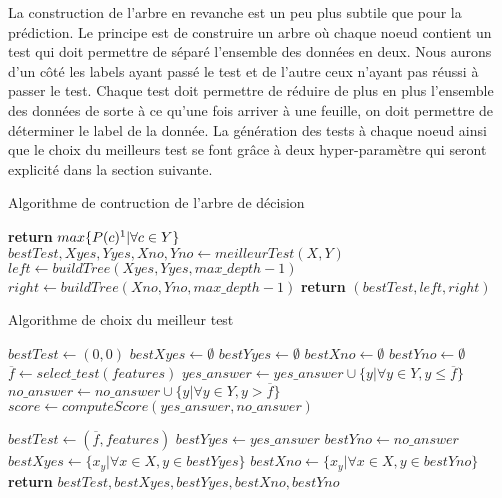 \documentclass[french, 14pt]{memoir}
\begin{document}
La construction de l'arbre en revanche est un peu plus subtile que pour la prédiction. Le principe est de construire un arbre où chaque noeud contient un test qui doit permettre de séparé l'ensemble des données en deux. Nous aurons d'un côté les labels ayant passé le test et de l'autre ceux n'ayant pas réussi à passer le test. Chaque test doit permettre de réduire de plus en plus l'ensemble des données de sorte à ce qu'une fois arriver à une feuille, on doit permettre de déterminer le label de la donnée. La génération des tests à chaque noeud ainsi que le choix du meilleurs test se font grâce à deux hyper-paramètre qui seront explicité dans la section suivante. 

\begin{algorithm}
\begin{minipage}[t]{20cm}
\caption{Algorithme de contruction de l'arbre de décision}
\label{buildTree}
\begin{algorithmic}[1]
\State \textbf{return} $max\{P(c)\footnote{où P(c) est la probabilité d'apparition de la classe c dans Y}|\forall c \in Y\}$
\Else
\State $bestTest, Xyes, Yyes, Xno, Yno \gets meilleurTest(X, Y)$
\State $left \gets buildTree(Xyes, Yyes, max\_depth - 1)$
\State $right \gets buildTree(Xno, Yno, max\_depth - 1)$
\State \textbf{return} $(bestTest, left, right)$
\EndIf
\EndFunction
\end{algorithmic}
\end{minipage}
\end{algorithm}

\begin{algorithm}
\begin{minipage}[t]{20cm}
\caption{Algorithme de choix du meilleur test}
\label{getBestTest}
\begin{algorithmic}[1]
\State $bestTest \gets (0,0)$
\State $bestXyes \gets \emptyset$
\State $bestYyes \gets \emptyset$
\State $bestXno \gets \emptyset$
\State $bestYno \gets \emptyset$
\State $\overline{f} \gets select\_test(features)$
\State $yes\_answer \gets yes\_answer \cup \{y | \forall y \in Y, y \leq \overline{f} \}$
\State $no\_answer \gets no\_answer \cup \{y | \forall y \in Y, y > \overline{f} \}$
\State $score \gets computeScore(yes\_answer, no\_answer)$

\State $bestTest \gets (\overline{f}, features)$
\State $bestYyes \gets yes\_answer$
\State $bestYno \gets no\_answer$
 \State $bestXyes \gets \{x_y |\forall x \in X, y \in bestYyes\}$
 \State $bestXno \gets \{x_y |\forall x \in X, y \in bestYno\}$
\EndIf
\EndFor
\State \textbf{return} $bestTest, bestXyes, bestYyes, bestXno, bestYno$
\EndFunction
\end{algorithmic}
\end{minipage}
\end{algorithm}
\end{document}
